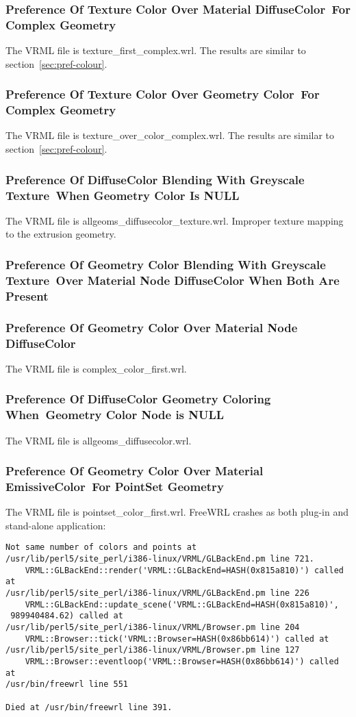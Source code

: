 \documentclass[12pt,letterpaper]{article}
\newcommand{\MatHa}{Preference Of Texture Color Over Material DiffuseColor~}
\newcommand{\MatHb}{For Complex Geometry}
\newcommand{\MatIa}{Preference Of Texture Color Over Geometry Color~}
\newcommand{\MatIb}{For Complex Geometry}
\newcommand{\MatJa}{Preference Of DiffuseColor Blending With Greyscale Texture~}
\newcommand{\MatJb}{When Geometry Color Is NULL}
\newcommand{\MatKa}{Preference Of Geometry Color Blending With Greyscale Texture~}
\newcommand{\MatKb}{Over Material Node DiffuseColor When Both Are Present}
\newcommand{\MatL}{Preference Of Geometry Color Over Material Node DiffuseColor}
\newcommand{\MatMa}{Preference Of DiffuseColor Geometry Coloring When~}
\newcommand{\MatMb}{Geometry Color Node is NULL}
\newcommand{\MatNa}{Preference Of Geometry Color Over Material EmissiveColor~}
\newcommand{\MatNb}{For PointSet Geometry}
\begin{document}
\subsubsection{\MatHa \MatHb}
The VRML file is texture\_first\_complex.wrl.\newline
The results are similar to section~\ref{sec:pref-colour}.

\subsubsection{\MatIa \MatIb}
The VRML file is texture\_over\_color\_complex.wrl.\newline
The results are similar to section~\ref{sec:pref-colour}.

\subsubsection{\MatJa \MatJb}
The VRML file is allgeoms\_diffusecolor\_texture.wrl.\newline
Improper texture mapping to the extrusion geometry.

\subsubsection{\MatKa \MatKb}
\subsubsection{\MatL}
The VRML file is complex\_color\_first.wrl.

\subsubsection{\MatMa \MatMb}
The VRML file is allgeoms\_diffusecolor.wrl.

\subsubsection{\MatNa \MatNb}
The VRML file is pointset\_color\_first.wrl.\newline
FreeWRL crashes as both plug-in and stand-alone application:
\begin{verbatim}
Not same number of colors and points at 
/usr/lib/perl5/site_perl/i386-linux/VRML/GLBackEnd.pm line 721.
    VRML::GLBackEnd::render('VRML::GLBackEnd=HASH(0x815a810)') called at 
/usr/lib/perl5/site_perl/i386-linux/VRML/GLBackEnd.pm line 226
    VRML::GLBackEnd::update_scene('VRML::GLBackEnd=HASH(0x815a810)',
 989940484.62) called at
/usr/lib/perl5/site_perl/i386-linux/VRML/Browser.pm line 204
    VRML::Browser::tick('VRML::Browser=HASH(0x86bb614)') called at 
/usr/lib/perl5/site_perl/i386-linux/VRML/Browser.pm line 127
    VRML::Browser::eventloop('VRML::Browser=HASH(0x86bb614)') called at 
/usr/bin/freewrl line 551

Died at /usr/bin/freewrl line 391.
\end{verbatim}
\end{document}
